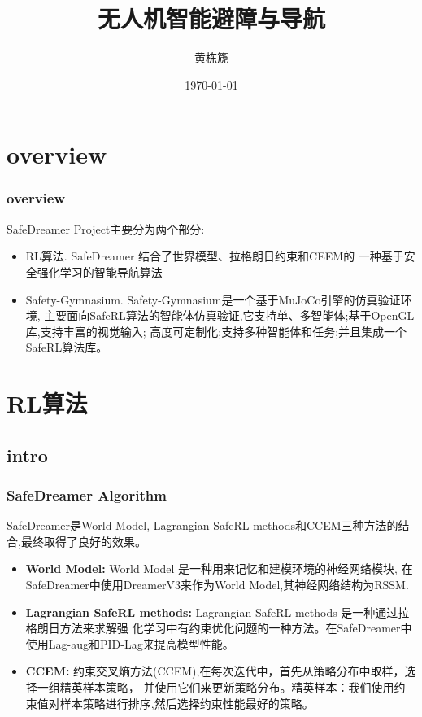 \documentclass[10pt,mathserif]{beamer}%
\title{无人机智能避障与导航}
\institute[北京航空航天大学\\计算机学院]{北京航空航天大学计算机学院23级硕士研究
生} %
\author{黄栋篪}
\date{\today}%
\begin{document}
{\xdbg {}}%

\section{overview}

\begin{frame}[t, fragile]
	\frametitle{overview}
	\begin{spacing}{1.5}
		SafeDreamer Project主要分为两个部分:
		\begin{itemize}
			\item RL算法. SafeDreamer 结合了世界模型、拉格朗日约束和CEEM的
			一种基于安全强化学习的智能导航算法
			\item Safety-Gymnasium. Safety-Gymnasium是一个基于MuJoCo引擎的仿真验证环境,
			主要面向SafeRL算法的智能体仿真验证,它支持单、多智能体;基于OpenGL库,支持丰富的视觉输入;
			高度可定制化;支持多种智能体和任务;并且集成一个SafeRL算法库。
		\end{itemize}
	\end{spacing}
\end{frame}

\section{RL算法}

\subsection{intro}

\begin{frame}[t, fragile]
	\frametitle{SafeDreamer Algorithm}
	\begin{spacing}{1.3}
		SafeDreamer是World Model, Lagrangian SafeRL methods和CCEM三种方法的结合,最终取得了良好的效果。
		\begin{itemize}
			\item \textbf{World Model:} World Model 是一种用来记忆和建模环境的神经网络模块,
			在SafeDreamer中使用DreamerV3来作为World Model,其神经网络结构为RSSM.
			\item \textbf{Lagrangian SafeRL methods:} Lagrangian SafeRL methods 是一种通过拉格朗日方法来求解强
			化学习中有约束优化问题的一种方法。在SafeDreamer中使用Lag-aug和PID-Lag来提高模型性能。
			\item \textbf{CCEM:} 约束交叉熵方法(CCEM),在每次迭代中，首先从策略分布中取样，选择一组精英样本策略，
			并使用它们来更新策略分布。精英样本：我们使用约束值对样本策略进行排序,然后选择约束性能最好的策略。
		\end{itemize}
	\end{spacing}
\end{frame}
\end{document}
